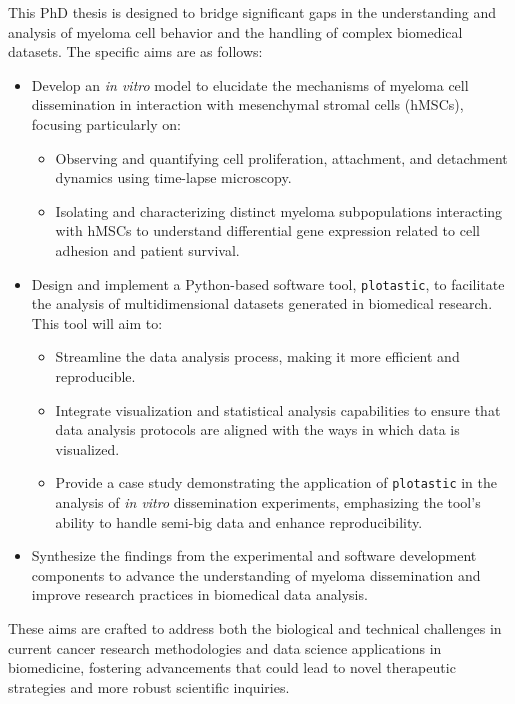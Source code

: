 

\label{sec:aims}%
This PhD thesis is designed to bridge significant gaps in the understanding and
analysis of myeloma cell behavior and the handling of complex biomedical
datasets. The specific aims are as follows:

\begin{itemize}
    \item Develop an \textit{in vitro} model to elucidate the mechanisms of
    myeloma cell dissemination in interaction with mesenchymal stromal cells
    (hMSCs), focusing particularly on:
    \begin{itemize}
        \item Observing and quantifying cell proliferation, attachment, and
        detachment dynamics using time-lapse microscopy.
        \item Isolating and characterizing distinct myeloma subpopulations
        interacting with hMSCs to understand differential gene expression
        related to cell adhesion and patient survival.
    \end{itemize}

    \item Design and implement a Python-based software tool, \texttt{plotastic},
    to facilitate the analysis of multidimensional datasets
    generated in biomedical research. This tool will aim to:
    \begin{itemize}
        \item Streamline the data analysis process, making it more efficient and
        reproducible.
        \item Integrate visualization and statistical analysis capabilities to
        ensure that data analysis protocols are aligned with the ways in which
        data is visualized.
        \item Provide a case study demonstrating the application of
        \texttt{plotastic} in the analysis of \textit{in vitro} dissemination
        experiments, emphasizing the tool’s ability to handle semi-big data and
        enhance reproducibility.
    \end{itemize}

    \item Synthesize the findings from the experimental and software development
    components to advance the understanding of myeloma dissemination and improve
    research practices in biomedical data analysis.
\end{itemize}

These aims are crafted to address both the biological and technical challenges
in current cancer research methodologies and data science applications in
biomedicine, fostering advancements that could lead to novel therapeutic
strategies and more robust scientific inquiries.